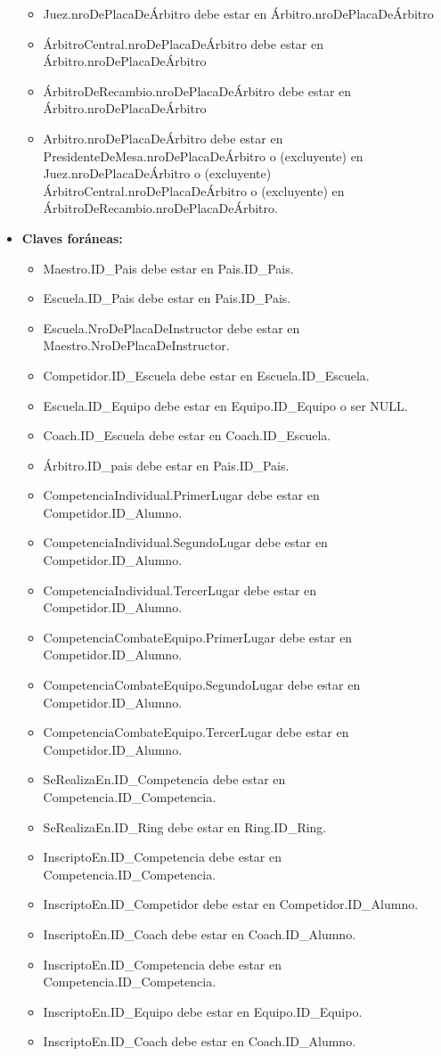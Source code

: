\begin{itemize}
\begin{itemize}
\item Juez.nroDePlacaDeÁrbitro debe estar en Árbitro.nroDePlacaDeÁrbitro
\item ÁrbitroCentral.nroDePlacaDeÁrbitro debe estar en Árbitro.nroDePlacaDeÁrbitro
\item ÁrbitroDeRecambio.nroDePlacaDeÁrbitro debe estar en Árbitro.nroDePlacaDeÁrbitro
\item Arbitro.nroDePlacaDeÁrbitro debe estar en PresidenteDeMesa.nroDePlacaDeÁrbitro o (excluyente) en Juez.nroDePlacaDeÁrbitro o (excluyente) ÁrbitroCentral.nroDePlacaDeÁrbitro o (excluyente) en ÁrbitroDeRecambio.nroDePlacaDeÁrbitro.
\end{itemize}
\item \textbf{Claves foráneas:}
\begin{itemize}
\item Maestro.ID\_Pais debe estar en Pais.ID\_Pais.
\item Escuela.ID\_Pais debe estar en Pais.ID\_Pais.
\item Escuela.NroDePlacaDeInstructor debe estar en Maestro.NroDePlacaDeInstructor.
\item Competidor.ID\_Escuela debe estar en Escuela.ID\_Escuela.
\item Escuela.ID\_Equipo debe estar en Equipo.ID\_Equipo o ser NULL.
\item Coach.ID\_Escuela debe estar en Coach.ID\_Escuela.
\item Árbitro.ID\_pais debe estar en Pais.ID\_Pais.
\item CompetenciaIndividual.PrimerLugar debe estar en Competidor.ID\_Alumno.
\item CompetenciaIndividual.SegundoLugar debe estar en Competidor.ID\_Alumno.
\item CompetenciaIndividual.TercerLugar debe estar en Competidor.ID\_Alumno.
\item CompetenciaCombateEquipo.PrimerLugar debe estar en Competidor.ID\_Alumno.
\item CompetenciaCombateEquipo.SegundoLugar debe estar en Competidor.ID\_Alumno.
\item CompetenciaCombateEquipo.TercerLugar debe estar en Competidor.ID\_Alumno.
\item SeRealizaEn.ID\_Competencia debe estar en Competencia.ID\_Competencia.
\item SeRealizaEn.ID\_Ring debe estar en Ring.ID\_Ring.
\item InscriptoEn.ID\_Competencia debe estar en Competencia.ID\_Competencia.
\item InscriptoEn.ID\_Competidor debe estar en Competidor.ID\_Alumno.
\item InscriptoEn.ID\_Coach debe estar en Coach.ID\_Alumno.
\item InscriptoEn.ID\_Competencia debe estar en Competencia.ID\_Competencia.
\item InscriptoEn.ID\_Equipo debe estar en Equipo.ID\_Equipo.
\item InscriptoEn.ID\_Coach debe estar en Coach.ID\_Alumno.
\end{itemize}
\end{itemize}